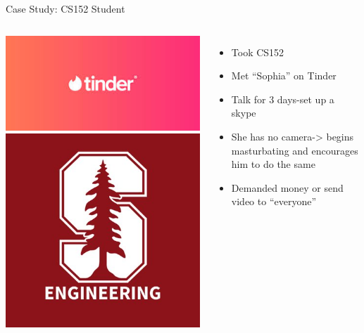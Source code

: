 \documentclass[nobackground,dvipsnames,table,aspectratio=169]{beamer}
\begin{document}
\begin{frame}{Case Study: CS152 Student}
    \begin{columns}
            \includegraphics[width=\textwidth]{tinder}
            \includegraphics[width=\textwidth]{stanford-engineering}
            \begin{itemize}
                \item Took CS152 
                \item Met “Sophia” on Tinder
                \item Talk for 3 days-set up a skype
                \item She has no camera-> begins masturbating and encourages him to do the same
                \item Demanded money or send video to “everyone”
            \end{itemize}
    \end{columns}
\end{frame}
\end{document}
